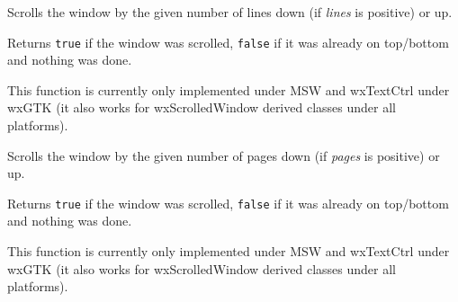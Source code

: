 

\label{wxwindowscrolllines}


Scrolls the window by the given number of lines down (if {\it lines} is
positive) or up.


Returns {\tt true} if the window was scrolled, {\tt false} if it was already
on top/bottom and nothing was done.


This function is currently only implemented under MSW and wxTextCtrl under
wxGTK (it also works for wxScrolledWindow derived classes under all
platforms).




\label{wxwindowscrollpages}


Scrolls the window by the given number of pages down (if {\it pages} is
positive) or up.


Returns {\tt true} if the window was scrolled, {\tt false} if it was already
on top/bottom and nothing was done.


This function is currently only implemented under MSW and wxTextCtrl under
wxGTK (it also works for wxScrolledWindow derived classes under all
platforms).




\label{wxwindowscrollwindow}


